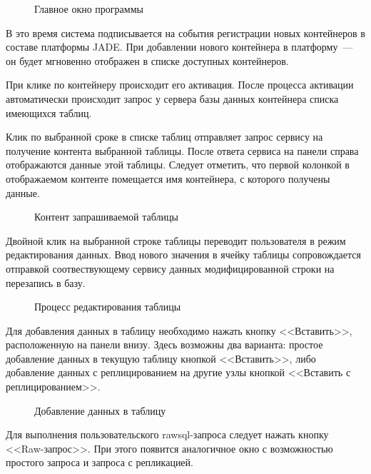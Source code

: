 \begin{figure}[h!]
\caption{Главное окно программы}
\label{3:proga}
\end{figure}

В это время система подписывается на события регистрации новых контейнеров в составе платформы JADE. При добавлении нового контейнера в платформу~--- он будет мгновенно отображен в списке доступных контейнеров.

При клике по контейнеру происходит его активация. После процесса активации автоматически происходит запрос у сервера базы данных контейнера списка имеющихся таблиц.

Клик по выбранной сроке в списке таблиц отправляет запрос сервису на получение контента выбранной таблицы. После ответа сервиса на панели справа отображаются данные этой таблицы. Следует отметить, что первой колонкой в отображаемом контенте помещается имя контейнера, с которого получены данные.

\begin{figure}[h!]
\caption{Контент запрашиваемой таблицы}
\label{3:content}
\end{figure}

Двойной клик на выбранной строке таблицы переводит пользователя в режим редактирования данных. Ввод нового значения в ячейку таблицы сопровождается отправкой соотвествующему сервису данных модифицированной строки на перезапись в базу.

\begin{figure}[h!]
\caption{Процесс редактирования таблицы}
\label{3:update}
\end{figure}

Для добавления данных в таблицу необходимо нажать кнопку <<Вставить>>, расположенную на панели внизу. Здесь возможны два варианта: простое добавление данных в текущую таблицу кнопкой <<Вставить>>, либо добавление данных с реплицированием на другие узлы кнопкой <<Вставить с реплицированием>>.

\begin{figure}[h!]
\caption{Добавление данных в таблицу}
\label{3:insert}
\end{figure}

Для выполнения пользовательского rawsql-запроса следует нажать кнопку <<Raw-запрос>>. При этого появится аналогичное окно с возможностью простого запроса и запроса с репликацией.

